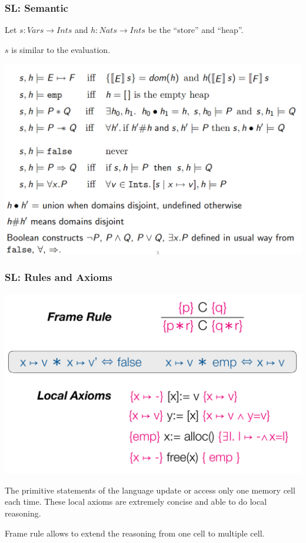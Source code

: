 \documentclass[11pt]{beamer}
\begin{document}
\begin{frame}\frametitle{SL: Semantic}
Let $s: Vars \rightarrow Ints$ and  $h: Nats \rightarrow Ints$ be the ``store'' and ``heap''.

$s$ is similar to the evaluation.


\begin{center}
\includegraphics[scale=0.28]{matSema.png}
\end{center}
\end{frame}

\begin{frame}\frametitle{SL: Rules and Axioms}

\begin{center}
\includegraphics[scale=0.2]{separules.png}
\end{center}
The primitive statements of the language update or access only one memory cell each time. These local axioms are extremely concise and able to do local reasoning.

Frame rule allows to extend the reasoning from one cell to multiple cell. 
\end{frame}
\end{document}
